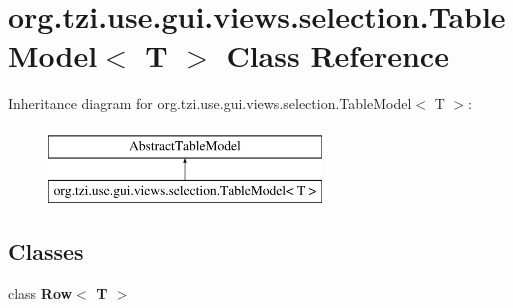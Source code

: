 \hypertarget{classorg_1_1tzi_1_1use_1_1gui_1_1views_1_1selection_1_1_table_model_3_01_t_01_4}{\section{org.\-tzi.\-use.\-gui.\-views.\-selection.\-Table\-Model$<$ T $>$ Class Reference}
\label{classorg_1_1tzi_1_1use_1_1gui_1_1views_1_1selection_1_1_table_model_3_01_t_01_4}
}
Inheritance diagram for org.\-tzi.\-use.\-gui.\-views.\-selection.\-Table\-Model$<$ T $>$\-:\begin{figure}[H]
\begin{center}
\leavevmode
\includegraphics[height=2.000000cm]{classorg_1_1tzi_1_1use_1_1gui_1_1views_1_1selection_1_1_table_model_3_01_t_01_4}
\end{center}
\end{figure}
\subsection*{Classes}
\begin{DoxyCompactItemize}
\item 
class {\bfseries Row$<$ T $>$}
\end{DoxyCompactItemize}
